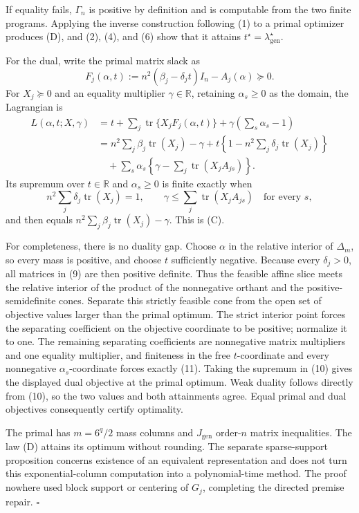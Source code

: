 If equality fails, \(\Gamma_n\) is positive by definition and is computable from the two finite programs.  Applying the inverse construction following (1) to a primal optimizer produces (D), and (2), (4), and (6) show that it attains \(t^\star=\lambda_{\mathrm{gen}}^\star\).

For the dual, write the primal matrix slack as
\[
F_j(\alpha,t)
:=n^2(\beta_j-\delta_jt)I_n-A_j(\alpha)\succeq0.
\tag{9}
\]
For \(X_j\succeq0\) and an equality multiplier \(\gamma\in\mathbb R\), retaining \(\alpha_s\ge0\) as the domain, the Lagrangian is
\[
\begin{aligned}
L(\alpha,t;X,\gamma)
&=t+\sum_j\operatorname{tr}\{X_jF_j(\alpha,t)\}
+\gamma\left(\sum_s\alpha_s-1\right)\\
&=n^2\sum_j\beta_j\operatorname{tr}(X_j)-\gamma
+t\left\{1-n^2\sum_j\delta_j\operatorname{tr}(X_j)\right\}\\
&\quad+\sum_s\alpha_s
\left\{\gamma-\sum_j\operatorname{tr}(X_jA_{js})\right\}.
\end{aligned}
\tag{10}
\]
Its supremum over \(t\in\mathbb R\) and \(\alpha_s\ge0\) is finite exactly when
\[
n^2\sum_j\delta_j\operatorname{tr}(X_j)=1,
\qquad
\gamma\le\sum_j\operatorname{tr}(X_jA_{js})
\quad\text{for every }s,
\tag{11}
\]
and then equals \(n^2\sum_j\beta_j\operatorname{tr}(X_j)-\gamma\). This is (C).

For completeness, there is no duality gap. Choose \(\alpha\) in the relative interior of \(\Delta_m\), so every mass is positive, and choose \(t\) sufficiently negative. Because every \(\delta_j>0\), all matrices in (9) are then positive definite. Thus the feasible affine slice meets the relative interior of the product of the nonnegative orthant and the positive-semidefinite cones. Separate this strictly feasible cone from the open set of objective values larger than the primal optimum. The strict interior point forces the separating coefficient on the objective coordinate to be positive; normalize it to one. The remaining separating coefficients are nonnegative matrix multipliers and one equality multiplier, and finiteness in the free \(t\)-coordinate and every nonnegative \(\alpha_s\)-coordinate forces exactly (11). Taking the supremum in (10) gives the displayed dual objective at the primal optimum. Weak duality follows directly from (10), so the two values and both attainments agree. Equal primal and dual objectives consequently certify optimality.

The primal has \(m=6^q/2\) mass columns and \(J_{\mathrm{gen}}\) order-\(n\) matrix inequalities. The law (D) attains its optimum without rounding. The separate sparse-support proposition concerns existence of an equivalent representation and does not turn this exponential-column computation into a polynomial-time method.  The proof nowhere used block support or centering of \(G_j\), completing the directed premise repair. \(\square\)